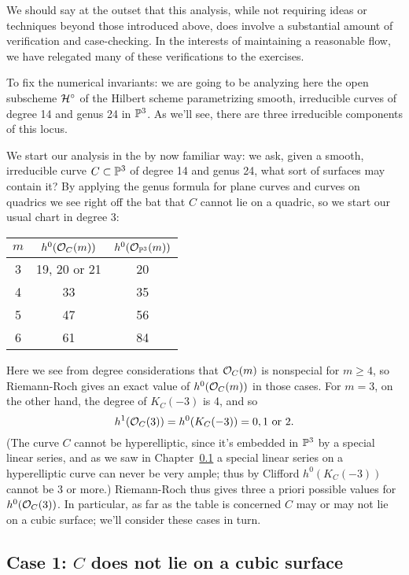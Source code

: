 We should say at the outset that this analysis, while not requiring ideas or techniques beyond those introduced above, does involve a substantial amount of verification and case-checking. In the interests of maintaining a reasonable flow, we have relegated many of these verifications to the exercises.

To fix the numerical invariants: we are going to be analyzing here the open subscheme ${\cal H}^\circ$ of the Hilbert scheme parametrizing smooth, irreducible curves of degree 14 and genus 24 in ${\mathbb P}^3$. As we'll see, there are three irreducible components of this locus. 

We start our analysis in the by now familiar way: we ask, given a smooth, irreducible curve $C \subset {\mathbb P}^3$ of degree 14 and genus 24, what sort of surfaces may contain it? By applying the genus formula for plane curves and curves on quadrics we see right off the bat that $C$ cannot lie on a quadric, so we start our usual chart in degree 3:

\begin{center}
\begin{tabular}{ c | c | c }\label{postulation table}
 $m$ & $h^0({\mathcal O}_C(m))$ & $h^0({\mathcal O}_{{\mathbb P}^3}(m))$ \\
 \hline
 3 & 19, 20 or 21 & 20 \\
 4 & 33 & 35 \\
 5 & 47 & 56 \\
 6 & 61 & 84
\end{tabular}
\end{center}

Here we see from degree considerations that ${\mathcal O}_C(m)$ is nonspecial for $m \geq 4$, so Riemann-Roch gives an exact value of $h^0({\mathcal O}_C(m))$ in those cases. For $m=3$, on the other hand, the degree of $K_C(-3)$ is 4, and so 
$$
h^1({\mathcal O}_C(3)) = h^0(K_C(-3)) = 0, 1 \text{ or } 2.
$$
(The curve $C$ cannot be hyperelliptic, since it's embedded in ${\mathbb P}^3$ by a special linear series, and as we saw in Chapter~\ref{} a special linear series on a hyperelliptic curve can never be very ample; thus by Clifford $h^0(K_C(-3))$ cannot be 3 or more.) Riemann-Roch thus gives three a priori possible values for $h^0({\mathcal O}_C(3))$. In particular, as far as the table is concerned $C$ may or may not lie on a cubic surface; we'll consider these cases in turn.

\subsection{Case 1: $C$ does not lie on a cubic surface}

